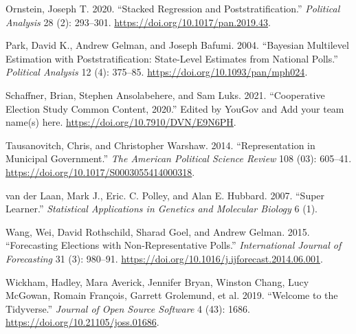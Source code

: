 \documentclass[
]{article}
\newlength{\cslhangindent}
\newlength{\cslentryspacingunit} %
\newenvironment{CSLReferences}[2] %
 {%
  \setlength{\parindent}{0pt}
  \ifodd #1
  \let\oldpar\par
  \def\par{\hangindent=\cslhangindent\oldpar}
  \fi
  \setlength{\parskip}{#2\cslentryspacingunit}
 }%
 {}
\begin{document}
\begin{CSLReferences}{1}{0}
\leavevmode{}%
Ornstein, Joseph T. 2020. {``Stacked Regression and
Poststratification.''} \emph{Political Analysis} 28 (2): 293--301.
\url{https://doi.org/10.1017/pan.2019.43}.

\leavevmode{}%
Park, David K., Andrew Gelman, and Joseph Bafumi. 2004. {``Bayesian
Multilevel Estimation with Poststratification: State-Level Estimates
from National Polls.''} \emph{Political Analysis} 12 (4): 375--85.
\url{https://doi.org/10.1093/pan/mph024}.

\leavevmode{}%
Schaffner, Brian, Stephen Ansolabehere, and Sam Luks. 2021.
{``Cooperative Election Study Common Content, 2020.''} Edited by YouGov
and Add your team name(s) here.
\url{https://doi.org/10.7910/DVN/E9N6PH}.

\leavevmode{}%
Tausanovitch, Chris, and Christopher Warshaw. 2014. {``Representation in
Municipal Government.''} \emph{The American Political Science Review}
108 (03): 605--41. \url{https://doi.org/10.1017/S0003055414000318}.

\leavevmode{}%
van der Laan, Mark J., Eric. C. Polley, and Alan E. Hubbard. 2007.
{``Super Learner.''} \emph{Statistical Applications in Genetics and
Molecular Biology} 6 (1).

\leavevmode{}%
Wang, Wei, David Rothschild, Sharad Goel, and Andrew Gelman. 2015.
{``Forecasting Elections with Non-Representative Polls.''}
\emph{International Journal of Forecasting} 31 (3): 980--91.
\url{https://doi.org/10.1016/j.ijforecast.2014.06.001}.

\leavevmode{}%
Wickham, Hadley, Mara Averick, Jennifer Bryan, Winston Chang, Lucy
McGowan, Romain François, Garrett Grolemund, et al. 2019. {``Welcome to
the Tidyverse.''} \emph{Journal of Open Source Software} 4 (43): 1686.
\url{https://doi.org/10.21105/joss.01686}.

\end{CSLReferences}
\end{document}
